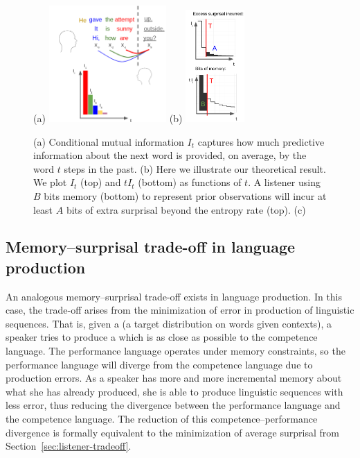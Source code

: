 \begin{figure}
	(a)
\includegraphics[width=0.4\textwidth]{figures-gdrive/mi-distance.png}
	(b)
\includegraphics[width=0.2\textwidth]{figures-gdrive/theorem.png}
	\caption{
		(a) Conditional mutual information $I_t$ captures how much predictive information about the next word is provided, on average, by the word $t$ steps in the past.
		(b) Here we illustrate our theoretical result. We plot $I_t$ (top) and $tI_t$ (bottom) as functions of $t$. A listener using $B$ bits memory (bottom) to represent prior observations will incur at least $A$ bits of extra surprisal beyond the entropy rate (top). 
		(c)  
}\label{fig:theorem}
\end{figure}



\subsection{Memory--surprisal trade-off in language production}

An analogous memory--surprisal trade-off exists in language production. In this case, the trade-off arises from the minimization of error in production of linguistic sequences. That is, given a  (a target distribution on words given contexts), a speaker tries to produce a  which is as close as possible to the competence language. The performance language operates under memory constraints, so the performance language will diverge from the competence language due to production errors. As a speaker has more and more incremental memory about what she has already produced, she is able to produce linguistic sequences with less error, thus reducing the divergence between the performance language and the competence language. The reduction of this competence--performance divergence is formally equivalent to the minimization of average surprisal from Section~\ref{sec:listener-tradeoff}.

